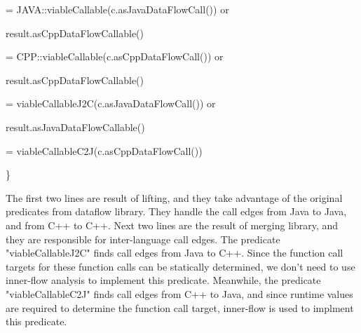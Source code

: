   = JAVA::viableCallable(c.asJavaDataFlowCall()) or

result.asCppDataFlowCallable()

  = CPP::viableCallable(c.asCppDataFlowCall()) or

result.asCppDataFlowCallable()

  = viableCallableJ2C(c.asJavaDataFlowCall()) or

result.asJavaDataFlowCallable()

  = viableCallableC2J(c.asCppDataFlowCall())

\}

The first two lines are result of lifting, and they take advantage of the original predicates from dataflow library.
They handle the call edges from Java to Java, and from C++ to C++.
Next two lines are the result of merging library, and they are responsible for inter-language call edges.
The predicate "viableCallableJ2C" finds call edges from Java to C++. Since the function call targets for
these function calls can be statically determined, we don't need to use inner-flow analysis to implement this predicate.
Meanwhile, the predicate "viableCallableC2J" finds call edges from C++ to Java, and since runtime values are required to
determine the function call target, inner-flow is used to implment this predicate.
